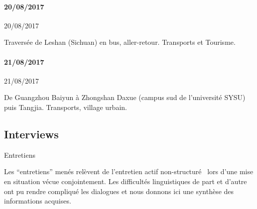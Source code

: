 \paragraph{20/08/2017}{20/08/2017}

Traversée de Leshan (Sichuan) en bus, aller-retour. Transports et Tourisme.



\paragraph{21/08/2017}{21/08/2017}

De Guangzhou Baiyun à Zhongshan Daxue (campus sud de l'université SYSU) puis Tangjia. Transports, village urbain.














\subsection{Interviews}{Entretiens}


Les ``entretiens'' menés relèvent de l'entretien actif non-structuré~\cite{holstein2004active} lors d'une mise en situation vécue conjointement. Les difficultés linguistiques de part et d'autre ont pu rendre compliqué les dialogues et nous donnons ici une synthèse des informations acquises.


















